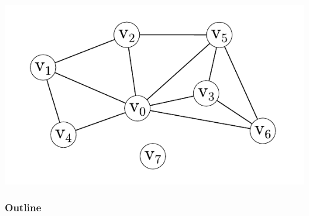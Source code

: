 \documentclass[xcolor=x11names,compress]{beamer}
\begin{document}
\begin{frame}
\begin{center}
\begin{overprint}
			\includegraphics[scale=1.0]{img/graph/chordalsimple2.pdf}
		\end{overprint}
	\end{center}
\end{frame}

\begin{frame}
	\titlepage
\end{frame}

\bgroup
{}
\begin{frame}
	\frametitle{Outline}
	\tableofcontents[pausesections]
\end{frame}
\egroup
\end{document}
